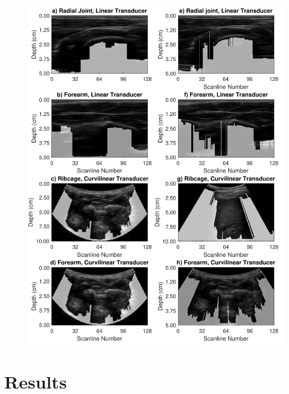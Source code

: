 \documentclass[preprint,5p]{elsarticle}
\begin{document}
\begin{figure}
	\includegraphics[scale=0.55]{fig1.pdf}
\end{figure}
\section*{Results}
\label{Results}
\end{document}
